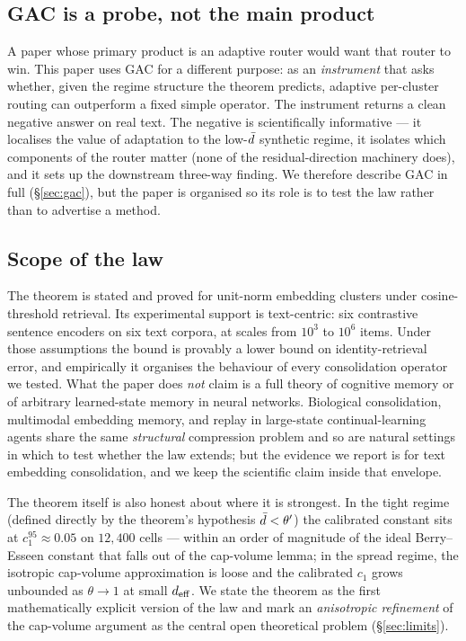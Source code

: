 \subsection{GAC is a probe, not the main product}
\label{sec:intro:gac_as_probe}

A paper whose primary product is an adaptive router would want that
router to win. This paper uses GAC for a different purpose: as an
\emph{instrument} that asks whether, given the regime structure the
theorem predicts, adaptive per-cluster routing can outperform a
fixed simple operator. The instrument returns a clean negative
answer on real text. The negative is scientifically informative ---
it localises the value of adaptation to the low-$\bar{d}$ synthetic
regime, it isolates which components of the router matter
(none of the residual-direction machinery does), and it sets up the
downstream three-way finding. We therefore describe GAC in full
(\S\ref{sec:gac}), but the paper is organised so its role is to
test the law rather than to advertise a method.

\subsection{Scope of the law}
\label{sec:intro:scope}

The theorem is stated and proved for unit-norm embedding clusters
under cosine-threshold retrieval. Its experimental support is
text-centric: six contrastive sentence encoders on six text corpora,
at scales from $10^3$ to $10^6$ items. Under those assumptions the
bound is provably a lower bound on identity-retrieval error, and
empirically it organises the behaviour of every consolidation
operator we tested. What the paper does \emph{not} claim is a full
theory of cognitive memory or of arbitrary learned-state memory in
neural networks. Biological consolidation, multimodal embedding
memory, and replay in large-state continual-learning agents share
the same \emph{structural} compression problem and so are natural
settings in which to test whether the law extends; but the
evidence we report is for text embedding consolidation, and we keep
the scientific claim inside that envelope.

The theorem itself is also honest about where it is strongest. In
the tight regime (defined directly by the theorem's hypothesis
$\bar{d} < \theta'$) the calibrated constant sits at $c_1^{95}
\approx 0.05$ on $12{,}400$ cells --- within an order of magnitude
of the ideal Berry--Esseen constant that falls out of the
cap-volume lemma; in the spread regime, the isotropic cap-volume
approximation is loose and the calibrated $c_1$ grows unbounded as
$\theta \to 1$ at small ${d_{\mathrm{eff}}}$.
We state the theorem as the first mathematically explicit version of
the law and mark an \emph{anisotropic refinement} of the cap-volume
argument as the central open theoretical problem
(\S\ref{sec:limits}).

